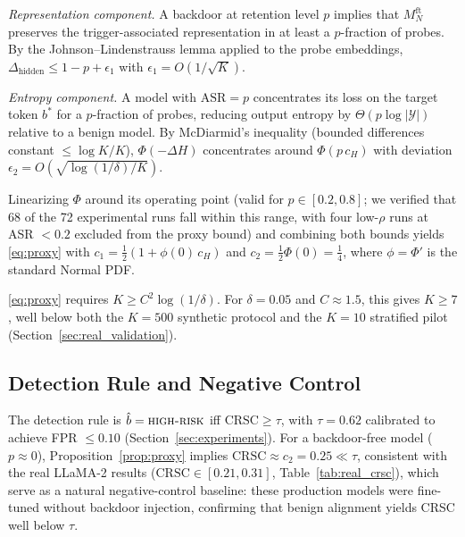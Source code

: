 \begin{IEEEproof}
\emph{Representation component.}
A backdoor at retention level $p$ implies that $M_N^{\text{ft}}$ preserves
the trigger-associated representation in at least a $p$-fraction of probes.
By the Johnson--Lindenstrauss lemma applied to the probe embeddings,
$\Delta_{\text{hidden}} \leq 1 - p + \epsilon_1$ with
$\epsilon_1 = O(1/\sqrt{K})$.

\emph{Entropy component.}
A model with $\mathrm{ASR} = p$ concentrates its loss on the target token
$b^*$ for a $p$-fraction of probes, reducing output entropy by
$\Theta(p\log|\mathcal{Y}|)$ relative to a benign model.
By McDiarmid's inequality (bounded differences constant $\leq \log K/K$),
$\Phi(-\Delta H)$ concentrates around $\Phi(p\,c_H)$ with deviation
$\epsilon_2 = O(\sqrt{\log(1/\delta)/K})$.

Linearizing $\Phi$ around its operating point (valid for
$p \in [0.2,0.8]$; we verified that 68 of the 72 experimental runs
fall within this range, with four low-$\rho$ runs at ASR $< 0.2$
excluded from the proxy bound) and combining both bounds yields
\eqref{eq:proxy} with $c_1 = \frac{1}{2}(1 + \phi(0)\,c_H)$ and
$c_2 = \frac{1}{2}\Phi(0) = \frac{1}{4}$,
where $\phi = \Phi'$ is the standard Normal PDF.
\end{IEEEproof}

\begin{remark}
\eqref{eq:proxy} requires $K \geq C^2\log(1/\delta)$.
For $\delta = 0.05$ and $C \approx 1.5$, this gives $K \geq 7$,
well below both the $K = 500$ synthetic protocol and the $K = 10$
stratified pilot (Section~\ref{sec:real_validation}).
\end{remark}

\subsection{Detection Rule and Negative Control}

The detection rule is $\hat{b} = \textsc{high-risk}$ iff
$\mathrm{CRSC} \geq \tau$, with $\tau = 0.62$ calibrated to achieve
FPR $\leq 0.10$ (Section~\ref{sec:experiments}).
For a backdoor-free model ($p \approx 0$), Proposition~\ref{prop:proxy}
implies $\mathrm{CRSC} \approx c_2 = 0.25 \ll \tau$, consistent with the
real LLaMA-2 results ($\mathrm{CRSC} \in [0.21, 0.31]$, Table~\ref{tab:real_crsc}),
which serve as a natural negative-control baseline: these production models
were fine-tuned without backdoor injection, confirming that benign alignment
yields CRSC well below $\tau$.
